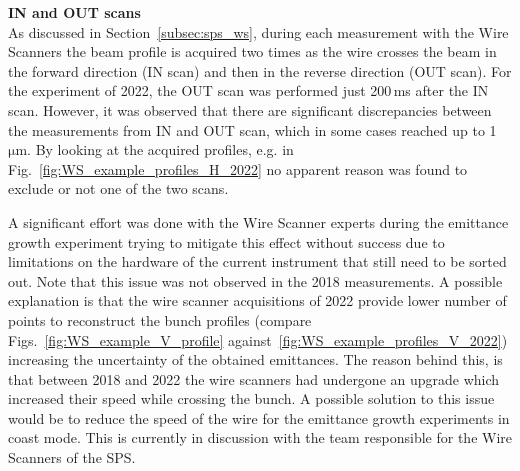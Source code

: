 


\textbf{IN and OUT scans}\\
As discussed in Section~\ref{subsec:sps_ws}, during each measurement with the Wire Scanners the beam profile is acquired two times as the wire crosses the beam in the forward direction (IN scan) and then in the reverse direction (OUT scan). For the experiment of 2022, the OUT scan was performed just 200\,ms after the IN scan. However, it was observed that there are significant discrepancies between the measurements from IN and OUT scan, which in some cases reached up to 1\,$\mathrm{\mu m}$. By looking at the acquired profiles, e.g. in Fig.~\ref{fig:WS_example_profiles_H_2022} no apparent reason was found to exclude or not one of the two scans.%


A significant effort was done with the Wire Scanner experts during the emittance growth experiment trying to mitigate this effect without success due to limitations on the hardware of the current instrument that still need to be sorted out. Note that this issue was not observed in the 2018 measurements. A possible explanation is that the wire scanner acquisitions of 2022 provide lower number of points to reconstruct the bunch profiles (compare Figs.~\ref{fig:WS_example_V_profile} against~\ref{fig:WS_example_profiles_V_2022}) increasing the uncertainty of the obtained emittances. The reason behind this, is that between 2018 and 2022 the wire scanners had undergone an upgrade which increased their speed while crossing the bunch. A possible solution to this issue would be to reduce the speed of the wire for the emittance growth experiments in coast mode. This is currently in discussion with the team responsible for the Wire Scanners of the SPS. 

